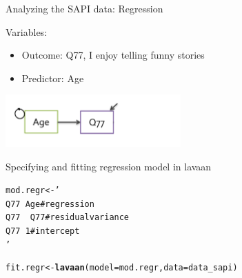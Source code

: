 \documentclass[10pt]{beamer}\usepackage[]{graphicx}\usepackage[]{xcolor}
\makeatletter
\newcommand{\hlstr}[1]{\textcolor[rgb]{0.192,0.494,0.8}{#1}}%
\newcommand{\hlstd}[1]{\textcolor[rgb]{0.345,0.345,0.345}{#1}}%
\newcommand{\hlkwb}[1]{\textcolor[rgb]{0.69,0.353,0.396}{#1}}%
\newcommand{\hlkwc}[1]{\textcolor[rgb]{0.333,0.667,0.333}{#1}}%
\newcommand{\hlkwd}[1]{\textcolor[rgb]{0.737,0.353,0.396}{\textbf{#1}}}%
\newenvironment{kframe}{%
 \def\at@end@of@kframe{}%
 \ifinner\ifhmode%
  \def\at@end@of@kframe{\end{minipage}}%
  \begin{minipage}{\columnwidth}%
 \fi\fi%
 \def\FrameCommand##1{\hskip\@totalleftmargin \hskip-\fboxsep
 \colorbox{shadecolor}{##1}\hskip-\fboxsep
     \hskip-\linewidth \hskip-\@totalleftmargin \hskip\columnwidth}%
 \MakeFramed {\advance\hsize-\width
   \@totalleftmargin\z@ \linewidth\hsize
   \@setminipage}}%
 {\par\unskip\endMakeFramed%
 \at@end@of@kframe}
\newenvironment{knitrout}{}{} %
\makeatother
\begin{document}
\begin{frame}[fragile]{Analyzing the SAPI data: Regression}

Variables:
\begin{itemize}
\item{Outcome: Q77, I enjoy telling funny stories}
\item{Predictor: Age}
\end{itemize}

\vspace{5mm}

\includegraphics[height=2cm,keepaspectratio=T] {RegressionModel.png}

\end{frame}
%
\begin{frame}[fragile]{Specifying and fitting regression model in lavaan}
\begin{knitrout}
\color{fgcolor}\begin{kframe}
\begin{alltt}
\hlstd{mod.regr} \hlkwb{<-} \hlstr{'
  Q77 ~  Age # regression
  Q77 ~~ Q77 # residual variance
  Q77 ~  1   # intercept
'}
\end{alltt}
\end{kframe}
\end{knitrout}

\vspace{5mm}

\begin{knitrout}
\color{fgcolor}\begin{kframe}
\begin{alltt}
\hlstd{fit.regr} \hlkwb{<-} \hlkwd{lavaan}\hlstd{(}\hlkwc{model} \hlstd{= mod.regr,} \hlkwc{data} \hlstd{= data_sapi)}
\end{alltt}
\end{kframe}
\end{knitrout}
\end{frame}
%
\end{document}
